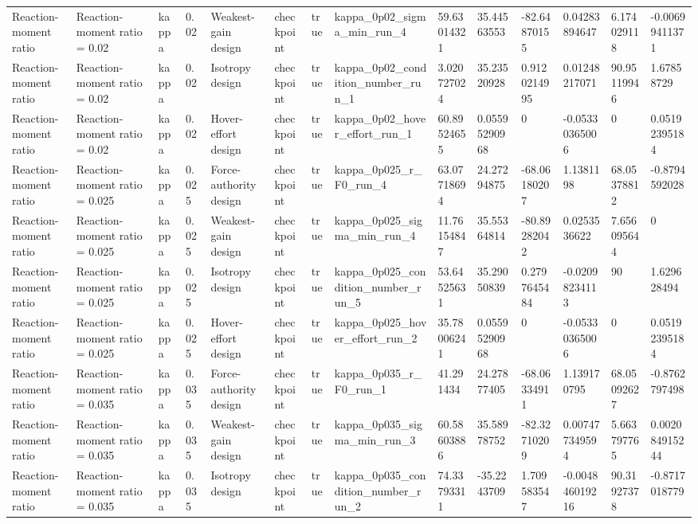 \begin{tabular}{@{}llllllllllllll@{}}
Reaction-moment ratio & Reaction-moment ratio = 0.02 & kappa & 0.02 & Weakest-gain design & checkpoint & true & kappa\_0p02\_sigma\_min\_run\_4 & 59.63014321 & 35.44563553 & -82.64870155 & 0.04283894647 & 6.174029118 & -0.00699411371 \\
Reaction-moment ratio & Reaction-moment ratio = 0.02 & kappa & 0.02 & Isotropy design & checkpoint & true & kappa\_0p02\_condition\_number\_run\_1 & 3.020727024 & 35.23520928 & 0.9120214995 & 0.01248217071 & 90.95119946 & 1.67858729 \\
Reaction-moment ratio & Reaction-moment ratio = 0.02 & kappa & 0.02 & Hover-effort design & checkpoint & true & kappa\_0p02\_hover\_effort\_run\_1 & 60.89524655 & 0.05595290968 & 0 & -0.05330365006 & 0 & 0.05192395184 \\
Reaction-moment ratio & Reaction-moment ratio = 0.025 & kappa & 0.025 & Force-authority design & checkpoint & true & kappa\_0p025\_r\_F0\_run\_4 & 63.07718694 & 24.27294875 & -68.06180207 & 1.1381198 & 68.05378812 & -0.8794592028 \\
Reaction-moment ratio & Reaction-moment ratio = 0.025 & kappa & 0.025 & Weakest-gain design & checkpoint & true & kappa\_0p025\_sigma\_min\_run\_4 & 11.76154847 & 35.55364814 & -80.89282042 & 0.0253536622 & 7.656095644 & 0 \\
Reaction-moment ratio & Reaction-moment ratio = 0.025 & kappa & 0.025 & Isotropy design & checkpoint & true & kappa\_0p025\_condition\_number\_run\_5 & 53.64525631 & 35.29050839 & 0.2797645484 & -0.02098234113 & 90 & 1.629628494 \\
Reaction-moment ratio & Reaction-moment ratio = 0.025 & kappa & 0.025 & Hover-effort design & checkpoint & true & kappa\_0p025\_hover\_effort\_run\_2 & 35.78006241 & 0.05595290968 & 0 & -0.05330365006 & 0 & 0.05192395184 \\
Reaction-moment ratio & Reaction-moment ratio = 0.035 & kappa & 0.035 & Force-authority design & checkpoint & true & kappa\_0p035\_r\_F0\_run\_1 & 41.291434 & 24.27877405 & -68.06334911 & 1.139170795 & 68.05092627 & -0.8762797498 \\
Reaction-moment ratio & Reaction-moment ratio = 0.035 & kappa & 0.035 & Weakest-gain design & checkpoint & true & kappa\_0p035\_sigma\_min\_run\_3 & 60.58603886 & 35.58978752 & -82.32710209 & 0.007477349594 & 5.663797765 & 0.002084915244 \\
Reaction-moment ratio & Reaction-moment ratio = 0.035 & kappa & 0.035 & Isotropy design & checkpoint & true & kappa\_0p035\_condition\_number\_run\_2 & 74.33793311 & -35.2243709 & 1.709583547 & -0.004846019216 & 90.31927378 & -0.8717018779 \\

\end{tabular}
